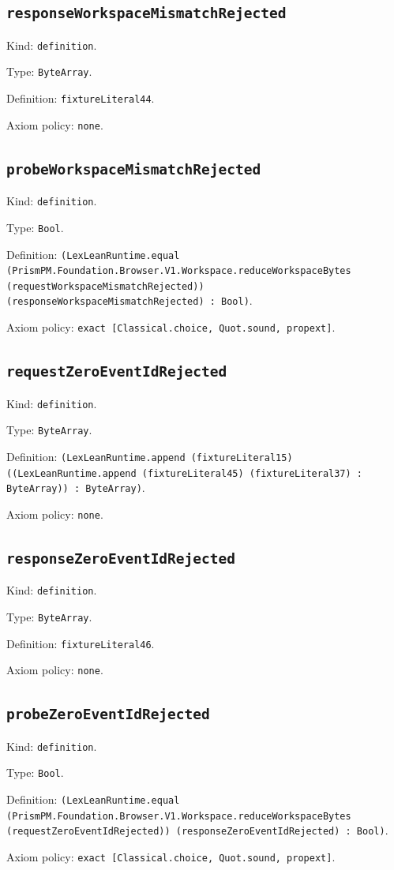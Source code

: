 \documentclass[11pt]{article}
\begin{document}
\subsection*{\texttt{responseWorkspaceMismatchRejected}}
\noindent Kind: \texttt{definition}.\par
\noindent Type: \texttt{ByteArray}.\par
\noindent Definition: \texttt{fixtureLiteral44}.\par
\noindent Axiom policy: \texttt{none}.\par
\subsection*{\texttt{probeWorkspaceMismatchRejected}}
\noindent Kind: \texttt{definition}.\par
\noindent Type: \texttt{Bool}.\par
\noindent Definition: \texttt{(LexLeanRuntime.equal (PrismPM.Foundation.Browser.V1.Workspace.reduceWorkspaceBytes (requestWorkspaceMismatchRejected)) (responseWorkspaceMismatchRejected) : Bool)}.\par
\noindent Axiom policy: \texttt{exact [Classical.choice, Quot.sound, propext]}.\par
\subsection*{\texttt{requestZeroEventIdRejected}}
\noindent Kind: \texttt{definition}.\par
\noindent Type: \texttt{ByteArray}.\par
\noindent Definition: \texttt{(LexLeanRuntime.append (fixtureLiteral15) ((LexLeanRuntime.append (fixtureLiteral45) (fixtureLiteral37) : ByteArray)) : ByteArray)}.\par
\noindent Axiom policy: \texttt{none}.\par
\subsection*{\texttt{responseZeroEventIdRejected}}
\noindent Kind: \texttt{definition}.\par
\noindent Type: \texttt{ByteArray}.\par
\noindent Definition: \texttt{fixtureLiteral46}.\par
\noindent Axiom policy: \texttt{none}.\par
\subsection*{\texttt{probeZeroEventIdRejected}}
\noindent Kind: \texttt{definition}.\par
\noindent Type: \texttt{Bool}.\par
\noindent Definition: \texttt{(LexLeanRuntime.equal (PrismPM.Foundation.Browser.V1.Workspace.reduceWorkspaceBytes (requestZeroEventIdRejected)) (responseZeroEventIdRejected) : Bool)}.\par
\noindent Axiom policy: \texttt{exact [Classical.choice, Quot.sound, propext]}.\par
\end{document}
